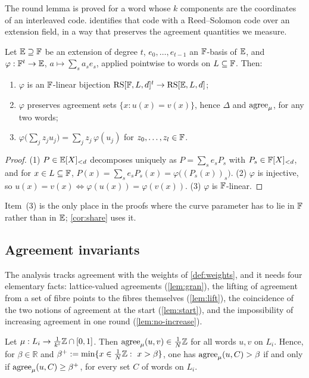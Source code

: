 The round lemma is proved for a word whose $k$ components are the coordinates of an interleaved
code.  identifies that code with a Reed--Solomon code over an extension field, in a
way that preserves the agreement quantities we measure.

\begin{lemma}[Interleaved code $=$ extension-field code]\label{lem:ext}
Let $\mathbb{E}\supseteq\mathbb{F}$ be an extension of degree $t$, $e_0,\dots,e_{t-1}$ an $\mathbb{F}$-basis of $\mathbb{E}$, and
$\varphi:\mathbb{F}^t\to\mathbb{E}$, $a\mapsto\sum_sa_se_s$, applied pointwise to words on $L\subseteq\mathbb{F}$. Then:
\begin{enumerate}
\item $\varphi$ is an $\mathbb{F}$-linear bijection $\mathrm{RS}[\mathbb{F},L,d]^t\to\mathrm{RS}[\mathbb{E},L,d]$;
\item $\varphi$ preserves agreement sets $\{x:u(x)=v(x)\}$, hence $\Delta$ and $\mathrm{agree}_\mu$, for
any two words;
\item $\varphi\big(\sum_jz_ju_j\big)=\sum_jz_j\,\varphi(u_j)$ for $z_0,\dots,z_l\in\mathbb{F}$.
\end{enumerate}
\end{lemma}

\begin{proof}
(1) $P\in\mathbb{E}[X]_{<d}$ decomposes uniquely as $P=\sum_se_sP_s$ with $P_s\in\mathbb{F}[X]_{<d}$, and for
$x\in L\subseteq\mathbb{F}$, $P(x)=\sum_se_sP_s(x)=\varphi\big((P_s(x))_s\big)$.
(2) $\varphi$ is injective, so $u(x)=v(x)\iff\varphi(u(x))=\varphi(v(x))$.
(3) $\varphi$ is $\mathbb{F}$-linear.
\end{proof}

Item~(3) is the only place in the proofs where the curve parameter has to lie in $\mathbb{F}$ rather than
in $\mathbb{E}$; \cref{cor:share} uses it.

\subsection{Agreement invariants}\label{sec:invariants}

The analysis tracks agreement with the weights of \cref{def:weights}, and it needs four
elementary facts: lattice-valued agreements (\cref{lem:gran}), the lifting of agreement from a set
of fibre points to the fibres themselves (\cref{lem:lift}), the coincidence of the two notions of
agreement at the start (\cref{lem:start}), and the impossibility of increasing agreement in one
round (\cref{lem:no-increase}).

\begin{lemma}[Granularity]\label{lem:gran}
Let $\mu:L_i\to\frac1{k^i}\mathbb{Z}\cap[0,1]$. Then $\mathrm{agree}_\mu(u,v)\in\frac1N\mathbb{Z}$ for all words $u,v$ on
$L_i$. Hence, for $\beta\in\mathbb R$ and $\beta^+:=\min\{x\in\frac1N\Z:\ x>\beta\}$, one has
$\mathrm{agree}_\mu(u,C)>\beta$ if and only if $\mathrm{agree}_\mu(u,C)\ge\beta^+$, for every set $C$ of words on
$L_i$.
\end{lemma}

